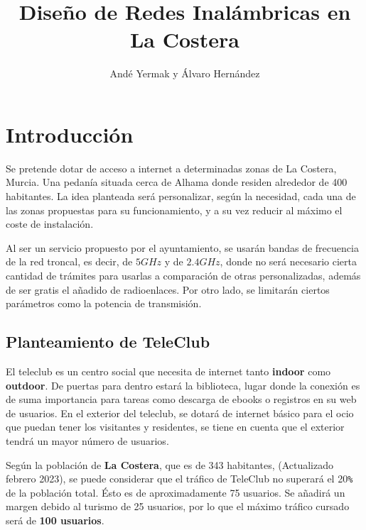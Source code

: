 \documentclass{article}
\title{Diseño de Redes Inalámbricas en La Costera}
\author{Andé Yermak y Álvaro Hernández}
\begin{document}
\maketitle

\tableofcontents
\newpage

\section{Introducción}

Se pretende dotar de acceso a internet a determinadas zonas de La Costera, Murcia. Una pedanía situada cerca de Alhama donde residen alrededor de 400 habitantes. La idea planteada será personalizar, según la necesidad, cada una de las zonas propuestas para su funcionamiento, y a su vez reducir al máximo el coste de instalación.

\quad

Al ser un servicio propuesto por el ayuntamiento, se usarán bandas de frecuencia de la red troncal, es decir, de $5GHz$ y de $2.4GHz$, donde no será necesario cierta cantidad de trámites para usarlas a comparación de otras personalizadas, además de ser gratis el añadido de radioenlaces. Por otro lado, se limitarán ciertos parámetros como la potencia de transmisión.

\subsection{Planteamiento de TeleClub}

El teleclub es un centro social que necesita de internet tanto \textbf{indoor} como \textbf{outdoor}. De puertas para dentro estará la biblioteca, lugar donde la conexión es de suma importancia para tareas como descarga de ebooks o registros en su web de usuarios. En el exterior del teleclub, se dotará de internet básico para el ocio que puedan tener los visitantes y residentes, se tiene en cuenta que el exterior tendrá un mayor número de usuarios.

\quad

Según la población de \textbf{La Costera}, que es de 343 habitantes, (Actualizado febrero 2023), se puede considerar que el tráfico de TeleClub no superará el 20\verb|%| de la población total. Ésto es de aproximadamente 75 usuarios. Se añadirá un margen debido al turismo de 25 usuarios, por lo que el máximo tráfico cursado será de \textbf{100 usuarios}.

\quad
\end{document}
